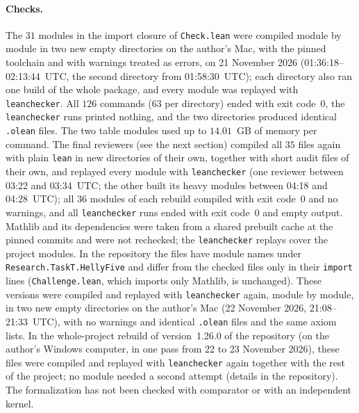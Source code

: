 \documentclass[11pt]{article}
\theoremstyle{definition}
\theoremstyle{remark}
\newcommand{\repoversion}{1.26.0}
\begin{document}
{\paragraph{Checks.} The $31$ modules in the import closure of
\texttt{Check.lean} were compiled module by module in two new empty directories
on the author's Mac, with the pinned toolchain and with warnings treated as
errors, on 21 November 2026 (01:36:18--02:13:44~UTC, the second directory from
01:58:30~UTC); each directory also ran one build of the whole package, and
every module was replayed with \texttt{leanchecker}. All $126$ commands ($63$
per directory) ended with exit code~$0$, the \texttt{leanchecker} runs printed
nothing, and the two directories produced identical \texttt{.olean} files. The
two table modules used up to $14.01$~GB of memory per command. The final
reviewers (see the next section) compiled all $35$ files again with plain
\texttt{lean} in new directories of their own, together with short audit files
of their own, and replayed every module with \texttt{leanchecker} (one reviewer between
03:22 and 03:34~UTC; the other built its heavy modules between 04:18 and
04:28~UTC); all $36$ modules of each rebuild compiled with exit code~$0$ and no
warnings, and all \texttt{leanchecker} runs ended with exit code~$0$ and empty
output. Mathlib and its dependencies were taken from a shared prebuilt cache
at the pinned commits and were not rechecked; the \texttt{leanchecker} replays
cover the project modules. In the repository the files have module names under
\texttt{Research.TaskT.HellyFive} and differ from the checked files only in
their \texttt{import} lines (\texttt{Challenge.lean}, which imports only
Mathlib, is unchanged).
These versions were compiled and replayed with \texttt{leanchecker} again, module by module, in two new empty directories on the author's Mac (22 November 2026, 21:08--21:33~UTC), with no warnings and identical \texttt{.olean} files and the same axiom lists.
In the whole-project rebuild of version~\repoversion{} of the repository (on the author's Windows computer, in one pass from 22 to 23 November 2026), these files were compiled and replayed with \texttt{leanchecker} again together with the rest of the project; no module needed a second attempt (details in the repository). The formalization has not been checked with comparator or with
an independent kernel.

\par}
\end{document}
